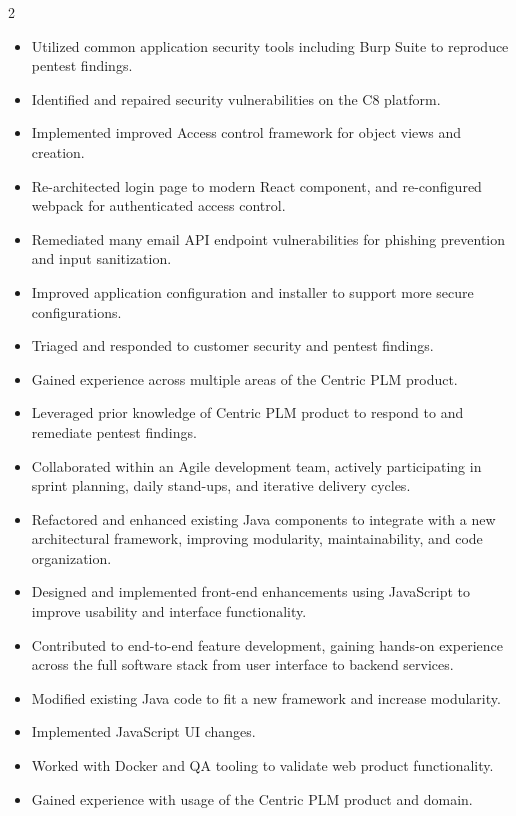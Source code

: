 \documentclass[10pt,a4paper,withhyper]{altacv}
\begin{document}
\begin{paracol}{2}
\else
{}
\begin{itemize}
\item Utilized common application security tools including Burp Suite to reproduce pentest findings.
\item Identified and repaired security vulnerabilities on the C8 platform.
\item Implemented improved Access control framework for object views and creation.
\item Re-architected login page to modern React component, and re-configured webpack for authenticated access control.
\item Remediated many email API endpoint vulnerabilities for phishing prevention and input sanitization.
\item Improved application configuration and installer to support more secure configurations.
\item Triaged and responded to customer security and pentest findings.
\item Gained experience across multiple areas of the Centric PLM product.
\item Leveraged prior knowledge of Centric PLM product to respond to and remediate pentest findings.
\item Collaborated within an Agile development team, actively participating in sprint planning, daily stand-ups, and iterative delivery cycles.
\item Refactored and enhanced existing Java components to integrate with a new architectural framework, improving modularity, maintainability, and code organization.
\item Designed and implemented front-end enhancements using JavaScript to improve usability and interface functionality.
\item Contributed to end-to-end feature development, gaining hands-on experience across the full software stack from user interface to backend services.
\item Modified existing Java code to fit a new framework and increase modularity.
\item Implemented JavaScript UI changes.
\item Worked with Docker and QA tooling to validate web product functionality.
\item Gained experience with usage of the Centric PLM product and domain.
\end{itemize}


\end{paracol}
\end{document}
